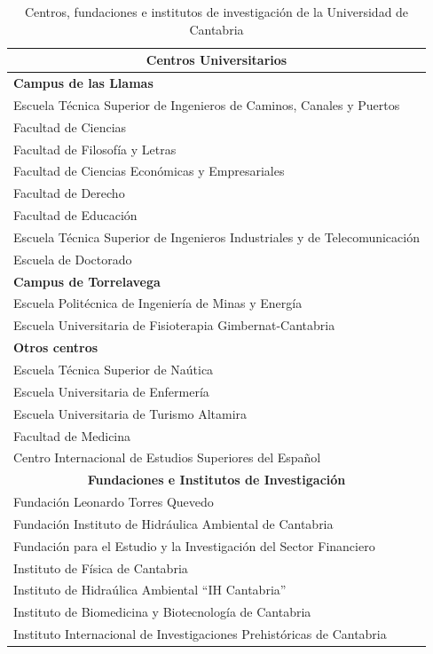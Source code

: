 \begin{table}[!ht]
\centering
\begin{tabular}{|l|}
\hline\hline
\multicolumn{1}{|c|}{\textbf{Centros Universitarios}}\\
\hline\hline
\textbf{Campus de las Llamas} \\
\hline 
Escuela Técnica Superior de Ingenieros de Caminos, Canales y Puertos\\
Facultad de Ciencias \\
Facultad de Filosofía y Letras \\
Facultad de Ciencias Económicas y Empresariales \\
Facultad de Derecho \\
Facultad de Educación \\
Escuela Técnica Superior de Ingenieros Industriales y de Telecomunicación \\
Escuela de Doctorado \\
\hline
\textbf{Campus de Torrelavega} \\
\hline 
Escuela Politécnica de Ingeniería de Minas y Energía \\
Escuela Universitaria de Fisioterapia Gimbernat-Cantabria \\
\hline
\textbf{Otros centros}\\
\hline
Escuela Técnica Superior de Naútica \\
Escuela Universitaria de Enfermería \\
Escuela Universitaria de Turismo Altamira\\
Facultad de Medicina \\
Centro Internacional de Estudios Superiores del Español\\
\hline\hline
\multicolumn{1}{|c|}{\textbf{Fundaciones e Institutos de Investigación}}\\
\hline\hline
Fundación Leonardo Torres Quevedo \\
Fundación Instituto de Hidráulica Ambiental de Cantabria \\
Fundación para el Estudio y la Investigación del Sector Financiero \\
Instituto de Física de Cantabria \\
Instituto de Hidraúlica Ambiental “IH Cantabria” \\
Instituto de Biomedicina y Biotecnología de Cantabria \\
Instituto Internacional de Investigaciones Prehistóricas de Cantabria \\
\hline\hline
\end{tabular}
\caption{\label{tab:centrosunican} Centros, fundaciones e institutos de investigación de la Universidad de Cantabria}
\end{table}

